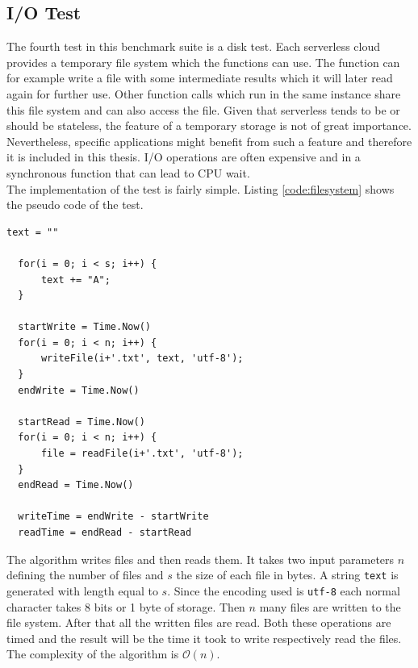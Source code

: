 \subsection{I/O Test}
The fourth test in this benchmark suite is a disk test. Each serverless cloud provides a temporary file system which the functions can use. The function can for example write a file with some intermediate results which it will later read again for further use. Other function calls which run in the same instance share this file system and can also access the file. Given that serverless tends to be or should be stateless, the feature of a temporary storage is not of great importance. Nevertheless, specific applications might benefit from such a feature and therefore it is included in this thesis. I/O operations are often expensive and in a synchronous function that can lead to \gls{CPU} wait.\\
The implementation of the test is fairly simple. Listing \ref{code:filesystem} shows the pseudo code of the test.


\begin{minipage}{\linewidth}
\begin{lstlisting}[frame=single,caption={I/O test pseudo code},label=code:filesystem,linewidth=0.75\textwidth,xleftmargin=.25\textwidth]
  text = ""
    
  for(i = 0; i < s; i++) {
      text += "A";
  }
  
  startWrite = Time.Now()
  for(i = 0; i < n; i++) {
      writeFile(i+'.txt', text, 'utf-8');
  }
  endWrite = Time.Now()
  
  startRead = Time.Now()
  for(i = 0; i < n; i++) {
      file = readFile(i+'.txt', 'utf-8');
  }
  endRead = Time.Now()
  
  writeTime = endWrite - startWrite
  readTime = endRead - startRead
\end{lstlisting}
\end{minipage}
\newline

The algorithm writes files and then reads them. It takes two input parameters $n$ defining the number of files and $s$ the size of each file in bytes. A string \texttt{text} is generated with length equal to $s$. Since the encoding used is \texttt{utf-8} each normal character takes 8 bits or 1 byte of storage. Then $n$ many files are written to the file system. After that all the written files are read. Both these operations are timed and the result will be the time it took to write respectively read the files. The complexity of the algorithm is $\mathcal{O}(n)$.

